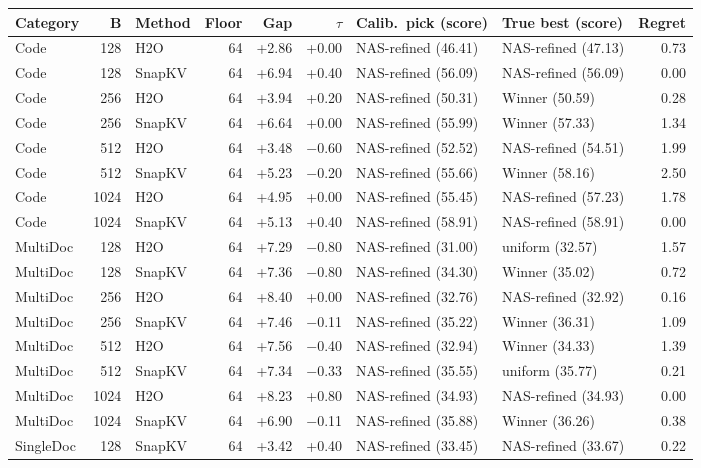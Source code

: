 \begin{table}[t]
  \centering
  \footnotesize
  \setlength{\tabcolsep}{4pt}
  \begin{tabular}{@{}l r l r r r l l r@{}}
    \toprule
    Category & B & Method & Floor & Gap & $\tau$ & Calib.\ pick (score) & True best (score) & Regret \\
    \midrule
    Code & 128 & H2O & 64 & +2.86 & +0.00 & NAS-refined (46.41) & NAS-refined (47.13) & 0.73 \\
    Code & 128 & SnapKV & 64 & +6.94 & +0.40 & NAS-refined (56.09) & NAS-refined (56.09) & 0.00 \\
    Code & 256 & H2O & 64 & +3.94 & +0.20 & NAS-refined (50.31) & Winner (50.59) & 0.28 \\
    Code & 256 & SnapKV & 64 & +6.64 & +0.00 & NAS-refined (55.99) & Winner (57.33) & 1.34 \\
    Code & 512 & H2O & 64 & +3.48 & $-$0.60 & NAS-refined (52.52) & NAS-refined (54.51) & 1.99 \\
    Code & 512 & SnapKV & 64 & +5.23 & $-$0.20 & NAS-refined (55.66) & Winner (58.16) & 2.50 \\
    Code & 1024 & H2O & 64 & +4.95 & +0.00 & NAS-refined (55.45) & NAS-refined (57.23) & 1.78 \\
    Code & 1024 & SnapKV & 64 & +5.13 & +0.40 & NAS-refined (58.91) & NAS-refined (58.91) & 0.00 \\
    MultiDoc & 128 & H2O & 64 & +7.29 & $-$0.80 & NAS-refined (31.00) & uniform (32.57) & 1.57 \\
    MultiDoc & 128 & SnapKV & 64 & +7.36 & $-$0.80 & NAS-refined (34.30) & Winner (35.02) & 0.72 \\
    MultiDoc & 256 & H2O & 64 & +8.40 & +0.00 & NAS-refined (32.76) & NAS-refined (32.92) & 0.16 \\
    MultiDoc & 256 & SnapKV & 64 & +7.46 & $-$0.11 & NAS-refined (35.22) & Winner (36.31) & 1.09 \\
    MultiDoc & 512 & H2O & 64 & +7.56 & $-$0.40 & NAS-refined (32.94) & Winner (34.33) & 1.39 \\
    MultiDoc & 512 & SnapKV & 64 & +7.34 & $-$0.33 & NAS-refined (35.55) & uniform (35.77) & 0.21 \\
    MultiDoc & 1024 & H2O & 64 & +8.23 & +0.80 & NAS-refined (34.93) & NAS-refined (34.93) & 0.00 \\
    MultiDoc & 1024 & SnapKV & 64 & +6.90 & $-$0.11 & NAS-refined (35.88) & Winner (36.26) & 0.38 \\
    SingleDoc & 128 & SnapKV & 64 & +3.42 & +0.40 & NAS-refined (33.45) & NAS-refined (33.67) & 0.22 \\

\end{tabular}
\end{table}

